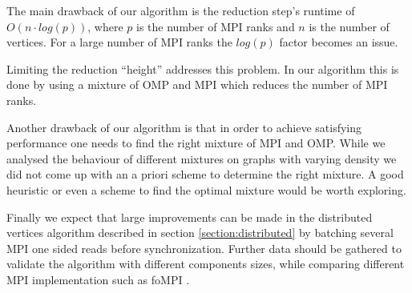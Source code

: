 The main drawback of our algorithm is the reduction step's runtime of $O\left(n \cdot
log\left(p\right)\right)$, where $p$ is the number of MPI ranks and $n$ is the number of vertices.
For a large number of MPI ranks the $log\left(p\right)$ factor becomes an issue.

Limiting the reduction ``height'' addresses this problem. In our algorithm this is done by using a
mixture of OMP and MPI which reduces the number of MPI ranks.

%

Another drawback of our algorithm is that in order to achieve satisfying performance one needs to
find the right mixture of MPI and OMP. While we analysed the behaviour of different mixtures on
graphs with varying density we did not come up with an a priori scheme to determine the right
mixture. A good heuristic or even a scheme to find the optimal mixture would be worth exploring.


Finally we expect that large improvements can be made in the distributed vertices algorithm
described in section \ref{section:distributed} by batching several MPI one sided reads
before synchronization. Further data should be gathered to validate the algorithm
with different components sizes, while comparing different MPI implementation such as
foMPI \cite{fompi-mpi3-one-sided}.
